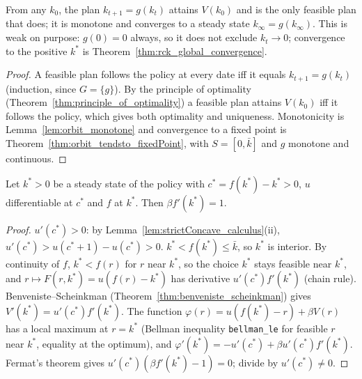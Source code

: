 \begin{theorem}
\label{thm:rck_converges}
\leanok
{}
From any $k_0$, the plan $k_{t+1} = g(k_t)$ attains $V(k_0)$ and is the only feasible plan that does; it is monotone and
converges to a steady state $k_\infty = g(k_\infty)$. This is weak on purpose: $g(0)=0$ always, so it does not
exclude $k_t\to0$; convergence to the positive $k^*$ is Theorem~\ref{thm:rck_global_convergence}.
\end{theorem}
\begin{proof}
\leanok
A feasible plan follows the policy at every date iff it equals $k_{t+1} = g(k_t)$ (induction, since $G = \{g\}$). By the
principle of optimality (Theorem~\ref{thm:principle_of_optimality}) a feasible plan attains $V(k_0)$ iff it follows the
policy, which gives both optimality and uniqueness. Monotonicity is Lemma~\ref{lem:orbit_monotone} and convergence to a
fixed point is Theorem~\ref{thm:orbit_tendsto_fixedPoint}, with $S = [0, \bar k]$ and $g$ monotone and continuous.
\end{proof}

\begin{theorem}
\label{thm:modified_golden_rule}
\leanok
{}
Let $k^* > 0$ be a steady state of the policy with $c^* = f(k^*) - k^* > 0$, $u$ differentiable at $c^*$ and $f$ at
$k^*$. Then $\beta f'(k^*) = 1$.
\end{theorem}
\begin{proof}
\leanok
$u'(c^*) > 0$: by Lemma~\ref{lem:strictConcave_calculus}(ii), $u'(c^*) > u(c^* + 1) - u(c^*) > 0$. $k^* < f(k^*) \le \bar k$,
so $k^*$ is interior. By continuity of $f$, $k^* < f(r)$ for $r$ near $k^*$, so the choice $k^*$ stays feasible near $k^*$,
and $r \mapsto F(r, k^*) = u(f(r) - k^*)$ has derivative $u'(c^*) f'(k^*)$ (chain rule). Benveniste--Scheinkman
(Theorem~\ref{thm:benveniste_scheinkman}) gives $V'(k^*) = u'(c^*) f'(k^*)$. The function
$\varphi(r) = u(f(k^*) - r) + \beta V(r)$ has a local maximum at $r = k^*$ (Bellman inequality \texttt{bellman\_le} for
feasible $r$ near $k^*$, equality at the optimum), and $\varphi'(k^*) = -u'(c^*) + \beta u'(c^*) f'(k^*)$. Fermat's
theorem gives $u'(c^*)(\beta f'(k^*) - 1) = 0$; divide by $u'(c^*) \neq 0$.
\end{proof}

